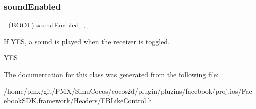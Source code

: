 \subsubsection{\texorpdfstring{sound\+Enabled}{soundEnabled}}
{\footnotesize\ttfamily -\/ (B\+O\+OL) sound\+Enabled\hspace{0.3cm}{\ttfamily [read]}, {\ttfamily [write]}, {\ttfamily [nonatomic]}, {\ttfamily [assign]}}

If Y\+ES, a sound is played when the receiver is toggled.

Y\+ES 

The documentation for this class was generated from the following file\+:\begin{DoxyCompactItemize}
\item 
/home/pmx/git/\+P\+M\+X/\+Simu\+Cocos/cocos2d/plugin/plugins/facebook/proj.\+ios/\+Facebook\+S\+D\+K.\+framework/\+Headers/F\+B\+Like\+Control.\+h\end{DoxyCompactItemize}
